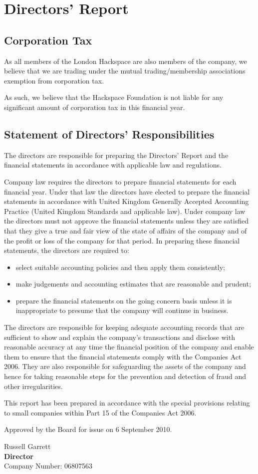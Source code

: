 \section{Directors' Report}



\subsection{Corporation Tax}
As all members of the London Hackspace are also members of the company, we believe
that we are trading under the mutual trading/membership associations exemption from corporation tax.

As such, we believe that the Hackspace Foundation is not liable for any significant amount of
corporation tax in this financial year.

\subsection{Statement of Directors' Responsibilities}
The directors are responsible for preparing the Directors' Report and the financial statements in accordance with applicable law and regulations.

Company law requires the directors to prepare financial statements for each financial year. Under that law the directors have elected to prepare the financial statements in accordance with United Kingdom Generally Accepted Accounting Practice (United Kingdom Standards and applicable law). Under company law the directors must not approve the financial statements unless they are satisfied that they give a true and fair view of the state of affairs of the company and of the profit or loss of the company for that period. In preparing these financial statements, the directors are required to:

\begin{itemize}
    \item select suitable accounting policies and then apply them consistently;
    \item make judgements and accounting estimates that are reasonable and prudent;
    \item prepare the financial statements on the going concern basis unless it is inappropriate to presume that the company will continue in business.
\end{itemize}

The directors are responsible for keeping adequate accounting records that are sufficient to show and explain the company's transactions and disclose with reasonable accuracy at any time the financial position of the company and enable them to ensure that the financial statements comply with the Companies Act 2006. They are also responsible for safeguarding the assets of the company and hence for taking reasonable steps for the prevention and detection of fraud and other irregularities.

This report has been prepared in accordance with the special provisions relating to small companies within Part 15 of the Companies Act 2006.

Approved by the Board for issue on 6 September 2010.
\vspace{48pt}

Russell Garrett \\
{\bf Director} \\
Company Number: 06807563
